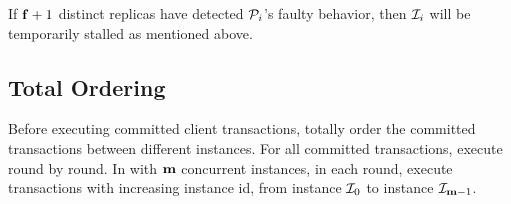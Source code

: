 \par If $\mathbf{f}+1$ distinct replicas have detected $\mathcal{P}_{i}$'s faulty behavior, then $\mathcal{I}_{i}$ will be temporarily 
stalled as mentioned above.

\subsection{Total Ordering}

\par Before executing committed client transactions, \RCC{} totally order the committed transactions between different 
instances. For all committed transactions, \RCC{} execute round by round. In \RCC{} with $\mathbf{m}$ concurrent instances, in 
each round, \RCC{} execute transactions with increasing instance id, from instance $\mathcal{I}_{0}$ to instance $\mathcal{I}_{\mathbf{m}-1}$.